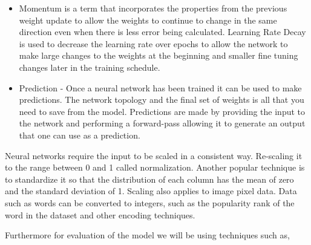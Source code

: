 \documentclass[12pt]{article}
\begin{document}
\begin{itemize}
\item
Momentum is a term that incorporates the properties from the previous weight update to allow the weights to continue to change in the same direction even when there is less error being calculated.
Learning Rate Decay is used to decrease the learning rate over epochs to allow the network to make large changes to the weights at the beginning and smaller fine tuning changes later in the training schedule.

\item
Prediction - Once a neural network has been trained it can be used to make predictions. The network topology and the final set of weights is all that you need to save from the model. Predictions are made by providing the input to the network and performing a forward-pass allowing it to generate an output that one can use as a prediction.

\end{itemize}

Neural networks require the input to be scaled in a consistent way. Re-scaling it to the range between 0 and 1 called normalization. Another popular technique is to standardize it so that the distribution of each column has the mean of zero and the standard deviation of 1. Scaling also applies to image pixel data. Data such as words can be converted to integers, such as the popularity rank of the word in the dataset and other encoding techniques.

Furthermore for evaluation of the model we will be using techniques such as\cite{metrics}, 
\end{document}
